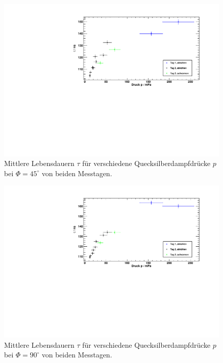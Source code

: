 \begin{figure}[H]
\begin{center}
  \includegraphics[width=\textwidth]{../img/taus_45.pdf}
  \caption{Mittlere Lebensdauern $\tau$ für verschiedene Quecksilberdampfdrücke $p$ bei $\Phi = 45^{\circ}$
  von beiden Messtagen.}
  \label{img:taus:45}
\end{center}
\end{figure}

\begin{figure}[H]
\begin{center}
  \includegraphics[width=\textwidth]{../img/taus_90.pdf}
  \caption{Mittlere Lebensdauern $\tau$ für verschiedene Quecksilberdampfdrücke $p$ bei $\Phi = 90^{\circ}$
  von beiden Messtagen.}
  \label{img:taus:90}
\end{center}
\end{figure}

